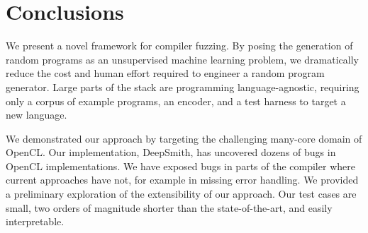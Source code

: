 \section{Conclusions}\label{sec:conclusion}

We present a novel framework for compiler fuzzing. By posing the generation of random programs as an unsupervised machine learning problem, we dramatically reduce the cost and human effort required to engineer a random program generator. Large parts of the stack are programming language-agnostic, requiring only a corpus of example programs, an encoder, and a test harness to target a new language.

We demonstrated our approach by targeting the challenging many-core domain of OpenCL. Our implementation, DeepSmith, has uncovered dozens of bugs in OpenCL implementations. We have exposed bugs in parts of the compiler where current approaches have not, for example in missing error handling. We provided a preliminary exploration of the extensibility of our approach. Our test cases are small, two orders of magnitude shorter than the state-of-the-art, and easily interpretable.


